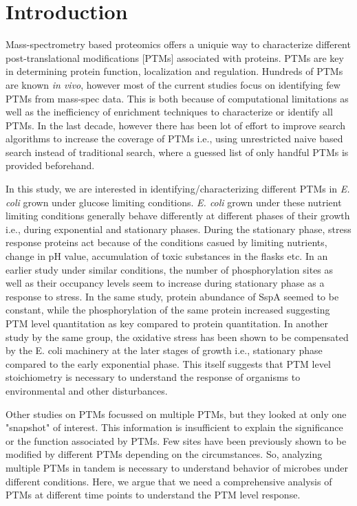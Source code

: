 \documentclass[12pt]{article}
\begin{document}
\section{Introduction}

Mass-spectrometry based proteomics offers a uniquie way to characterize different post-translational modifications [PTMs] associated with proteins. PTMs are key in determining protein function, localization and regulation. Hundreds of PTMs are known \emph{in vivo}, however most of the current studies focus on identifying few PTMs from mass-spec data. This is both because of computational limitations as well as the inefficiency of enrichment techniques to characterize or identify all PTMs. In the last decade, however there has been lot of effort to improve search algorithms to increase the coverage of PTMs i.e., using unrestricted naive based search instead of traditional search, where a guessed list of only handful PTMs is provided beforehand.

In this study, we are interested in identifying/characterizing different PTMs in \emph{E. coli} grown under glucose limiting conditions. \emph{E. coli} grown under these nutrient limiting conditions generally behave differently at different phases of their growth i.e., during exponential and stationary phases. During the stationary phase, stress response proteins act because of the conditions casued by limiting nutrients, change in pH value, accumulation of toxic substances in the flasks etc. In an earlier study under similar conditions, the number of phosphorylation sites as well as their occupancy levels seem to increase during stationary phase as a response to stress. In the same study, protein abundance of SspA seemed to be constant, while the phosphorylation of the same protein increased suggesting PTM level quantitation as key compared to protein quantitation. In another study by the same group, the oxidative stress has been shown to be compensated by the E. coli machinery at the later stages of growth i.e., stationary phase compared to the early exponential phase. This itself suggests that PTM level stoichiometry is necessary to understand the response of organisms to environmental and other disturbances.

Other studies on PTMs focussed on multiple PTMs, but they looked at only one "snapshot" of interest. This information is insufficient to explain the significance or the function associated by PTMs. Few sites have been previously shown to be modified by different PTMs depending on the circumstances. So, analyzing multiple PTMs in tandem is necessary to understand behavior of microbes under different conditions. Here, we argue that we need a comprehensive analysis of PTMs at different time points to understand the PTM level response. 
\end{document}
